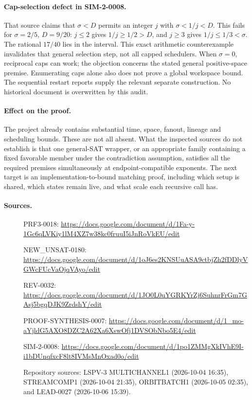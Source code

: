 \documentclass[11pt]{article}
\begin{document}
\paragraph{Cap-selection defect in SIM-2-0008.}
That source claims that $\sigma<D$ permits an integer $j$ with
$\sigma<1/j<D$. This fails for $\sigma=2/5$, $D=9/20$: $j\le2$ gives
$1/j\ge1/2>D$, and $j\ge3$ gives $1/j\le1/3<\sigma$.
The rational $17/40$ lies in the interval. This exact arithmetic counterexample
invalidates that general selection step, not all capped schedulers.
When $\sigma=0$, reciprocal caps can work; the objection concerns the stated
general positive-space premise. Enumerating caps alone also does not prove a
global workspace bound. The sequential restart reports supply the relevant
separate construction. No historical document is overwritten by this audit.

\paragraph{Effect on the proof.}
The project already contains substantial time, space, fanout, lineage and
scheduling bounds. These are not all absent. What the inspected sources do not
establish is that one general-SAT wrapper, or an appropriate family containing
a fixed favorable member under the contradiction assumption, satisfies all the
required premises simultaneously at endpoint-compatible exponents.
The next target is an implementation-to-bound matching proof, including which
setup is shared, which states remain live, and what scale each recursive call has.

\paragraph{Sources.}
\begin{description}
\item[] PRF3-0018: \url{https://docs.google.com/document/d/1Fa-y-1Gc6qLVKiy1lM4XZ7w38kc0fruuI5iJnRoVkEU/edit}
\item[] NEW\_UNSAT-0180: \url{https://docs.google.com/document/d/1oJ6es2KNSUuASA9ctbjZh2fDDlyVGWcFUcVaOjqVAyo/edit}
\item[] REV-0032: \url{https://docs.google.com/document/d/1JO0L0uYGRKYrZj6SuhnrFrGm7GAsj5bgqDJK9ZrdshY/edit}
\item[] PROOF-SYNTHESIS-0007: \url{https://docs.google.com/document/d/1_mo-aYjldG5AXO8DZC2A62Xa6XswOfj1DVSObNbo5E4/edit}
\item[] SIM-2-0008: \url{https://docs.google.com/document/d/1po1ZMMgXkIVhE9I-i1bDUnqfxcF8lt8IVMsMnOxad0o/edit}
\item[] Repository sources: LSPV-3 MULTICHANNEL1 (2026-10-04 16:35), STREAMCOMP1
(2026-10-04 21:35), ORBITBATCH1 (2026-10-05 02:35), and LEAD-0027 (2026-10-06 15:39).
\end{description}
\end{document}
